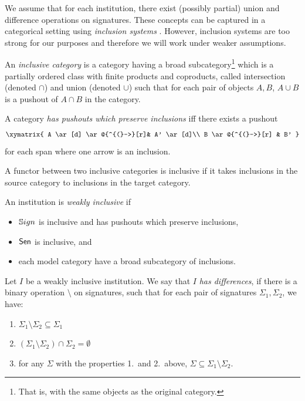 \documentclass[10pt,fleqn,%
\ifpretendfinal
final%
\else
draft%
\fi,
]{scrreprt}
\begin{document}
We assume that for each institution, there exist (possibly partial) union and difference operations on signatures.
These concepts can be captured in a categorical setting using \emph{inclusion systems} \cite{DGS91}.
However, inclusion systems are too strong for our purposes and therefore we will work under weaker assumptions.

\begin{definition}  
 An \emph{inclusive category} \cite{DBLP:conf/birthday/GoguenR04} 
 is a category having a broad subcategory\footnote{That is, with the same objects as the original category.}
which is a partially ordered class with finite products and coproducts, called intersection (denoted $\cap$) and union
(denoted $\cup$) such that for each pair of objects $A, B$, $A \cup B$ is a pushout of $A \cap B$ in the category.
 \end{definition}

\noindent
A category \emph{has pushouts which preserve inclusions} iff 
there exists a pushout
$$
\xymatrix{
  A  \ar[d] \ar@{^{(}->}[r]& A' \ar[d]\\
  B \ar@{^{(}->}[r] & B'
}
$$ for each span where one arrow is an inclusion.

A functor between two inclusive categories is inclusive if it takes inclusions in the source category to inclusions in the target category.

\begin{definition}
 An institution is \emph{weakly inclusive} if
   \begin{itemize}
     \item $\mathbb{S}ign$ is inclusive and has pushouts which preserve inclusions,
     \item $\mathsf{Sen}$ is inclusive, and
     \item each model category have a broad subcategory of inclusions.
   \end{itemize}
\end{definition}

Let $I$ be a weakly inclusive institution. We say that $I$  \emph{has differences}, if there is a binary operation $\setminus$ on signatures, 
such that for each pair of signatures 
$\Sigma_1, \Sigma_2$, we have:
\begin{enumerate}
  \item $\Sigma_1\setminus \Sigma_2 \subseteq \Sigma_1$
  \item $(\Sigma_1\setminus \Sigma_2) \cap \Sigma_2 = \emptyset$
   \item for any $\Sigma$ with the properties 1.\ and 2.\ above, $\Sigma \subseteq \Sigma_1\setminus \Sigma_2$.
\end{enumerate} 
  
\end{document}
